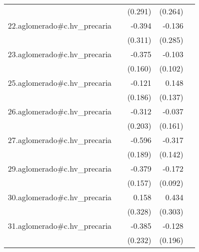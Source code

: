 {\begin{longtable}{l*{4}{D{.}{.}{-1}}}
            &                     &     (0.291)         &     (0.264)         &                     \\
\addlinespace
22.aglomerado#c.hv\_precaria&                     &      -0.394         &      -0.136         &                     \\
            &                     &     (0.311)         &     (0.285)         &                     \\
\addlinespace
23.aglomerado#c.hv\_precaria&                     &      -0.375\sym{*}  &      -0.103         &                     \\
            &                     &     (0.160)         &     (0.102)         &                     \\
\addlinespace
25.aglomerado#c.hv\_precaria&                     &      -0.121         &       0.148         &                     \\
            &                     &     (0.186)         &     (0.137)         &                     \\
\addlinespace
26.aglomerado#c.hv\_precaria&                     &      -0.312         &      -0.037         &                     \\
            &                     &     (0.203)         &     (0.161)         &                     \\
\addlinespace
27.aglomerado#c.hv\_precaria&                     &      -0.596\sym{**} &      -0.317\sym{*}  &                     \\
            &                     &     (0.189)         &     (0.142)         &                     \\
\addlinespace
29.aglomerado#c.hv\_precaria&                     &      -0.379\sym{*}  &      -0.172         &                     \\
            &                     &     (0.157)         &     (0.092)         &                     \\
\addlinespace
30.aglomerado#c.hv\_precaria&                     &       0.158         &       0.434         &                     \\
            &                     &     (0.328)         &     (0.303)         &                     \\
\addlinespace
31.aglomerado#c.hv\_precaria&                     &      -0.385         &      -0.128         &                     \\
            &                     &     (0.232)         &     (0.196)         &                     \\

\end{longtable}}
